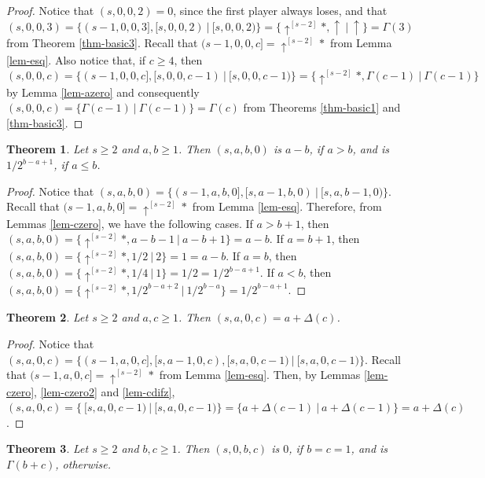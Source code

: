 \documentclass[a4paper,11pt]{article}
\newtheorem{theorem}{Theorem}
\begin{document}
\begin{proof}
Notice that $(s,0,0,2)=0$, since the first player always loses, and that $(s,0,0,3)=\{(s-1,0,0,3],[s,0,0,2)\ |\ [s,0,0,2)\}=\{\uparrow^{[s-2]}*,\uparrow\ |\ \uparrow\}=\Gamma(3)$ from Theorem \ref{thm-basic3}. 
Recall that $(s-1,0,0,c]=\uparrow^{[s-2]}*$ from Lemma \ref{lem-esq}.
Also notice that, if $c\geq 4$, then $(s,0,0,c)=\{(s-1,0,0,c],[s,0,0,c-1)\ |\ [s,0,0,c-1)\}=\{\uparrow^{[s-2]}*,\Gamma(c-1)\ |\ \Gamma(c-1)\}$ by Lemma \ref{lem-azero} and consequently $(s,0,0,c)=\{\Gamma(c-1)\ |\ \Gamma(c-1)\}=\Gamma(c)$ from Theorems \ref{thm-basic1} and \ref{thm-basic3}.
\end{proof}

\begin{theorem}\label{thm-caso2}
Let $s\geq 2$ and $a,b\geq 1$. Then $(s,a,b,0)$ is $a-b$, if $a>b$, and is $1/2^{b-a+1}$, if $a\leq b$.
\end{theorem}

\begin{proof}
Notice that $(s,a,b,0)=\{(s-1,a,b,0],[s,a-1,b,0)\ |\ [s,a,b-1,0)\}$.
Recall that $(s-1,a,b,0]=\uparrow^{[s-2]}*$ from Lemma \ref{lem-esq}.
Therefore, from Lemmas \ref{lem-czero}, we have the following cases.
If $a>b+1$, then $(s,a,b,0)=\{\uparrow^{[s-2]}*,a-b-1\ |\ a-b+1\}=a-b$.
If $a=b+1$, then $(s,a,b,0)=\{\uparrow^{[s-2]}*,1/2\ |\ 2\}=1=a-b$.
If $a=b$, then $(s,a,b,0)=\{\uparrow^{[s-2]}*,1/4\ |\ 1\}=1/2=1/2^{b-a+1}$.
If $a<b$, then $(s,a,b,0)=\{\uparrow^{[s-2]}*,1/2^{b-a+2}\ |\ 1/2^{b-a}\}=1/2^{b-a+1}$.
\end{proof}

\begin{theorem}\label{thm-caso3}
Let $s\geq 2$ and $a,c\geq 1$. Then $(s,a,0,c)=a+\Delta(c)$.
\end{theorem}

\begin{proof}
Notice that $(s,a,0,c)=\{(s-1,a,0,c],[s,a-1,0,c),[s,a,0,c-1)\ |\ [s,a,0,c-1)\}$.
Recall that $(s-1,a,0,c]=\uparrow^{[s-2]}*$ from Lemma \ref{lem-esq}.
Then, by Lemmas \ref{lem-czero}, \ref{lem-czero2} and \ref{lem-cdifz}, $(s,a,0,c)=\{\ [s,a,0,c-1)\ |\ [s,a,0,c-1)\}=\{a+\Delta(c-1)\ |\ a+\Delta(c-1)\}=a+\Delta(c)$.
\end{proof}

\begin{theorem}\label{thm-caso4}
Let $s\geq 2$ and $b,c\geq 1$. Then $(s,0,b,c)$ is $0$, if $b=c=1$, and is $\Gamma(b+c)$, otherwise.
\end{theorem}
\end{document}
